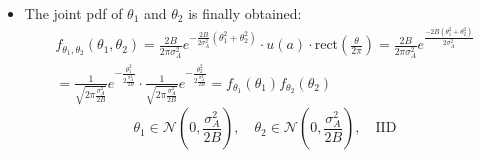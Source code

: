 \begin{itemize}
\begin{align*}
&= \frac{2B}{a} \cdot \frac{a}{2\pi \sigma_{A}^{2}} e^{-\frac{a^{2}}{2\sigma_{A}^{2}}}u(a) \cdot \text{rect}\left(\frac{\theta}{2\pi}\right) \Bigg|_{\substack{a=\sqrt{2B}\sqrt{\theta_{1}^{2}+\theta_{2}^{2}} \\ \theta=-\text{Arctg}(\theta_{2}/\theta_{1})}}
\end{align*}
\item The joint pdf of \(\theta_1\) and \(\theta_2\) is finally obtained:
\begin{align*}
f_{\theta_{1},\theta_{2}}(\theta_{1}, \theta_{2}) = \frac{2B}{2\pi \sigma_{A}^{2}} e^{-\frac{2B}{2\sigma_{A}^{2}}(\theta_{1}^{2}+\theta_{2}^{2})} \cdot u(a) \cdot \text{rect}\left(\frac{\theta}{2\pi}\right) =\frac{2B}{2\pi\sigma_A^2}e^{\frac{-2B(\theta_1^2+\theta_2^2)}{2\sigma_{A}^2}}\\
= \frac{1}{\sqrt{2\pi \frac{\sigma_{A}^{2}}{2B}}} e^{-\frac{\theta_{1}^{2}}{2\frac{\sigma_{A}^{2}}{2B}}} \cdot \frac{1}{\sqrt{2\pi \frac{\sigma_{A}^{2}}{2B}}} e^{-\frac{\theta_{2}^{2}}{2\frac{\sigma_{A}^{2}}{2B}}} = f_{\theta_{1}}(\theta_{1}) f_{\theta_{2}}(\theta_{2})
\end{align*}
\[
\theta_{1} \in \mathcal{N}\left(0, \frac{\sigma_{A}^{2}}{2B}\right), \quad \theta_{2} \in \mathcal{N}\left(0, \frac{\sigma_{A}^{2}}{2B}\right), \quad \text{IID}
\]
\end{itemize}
